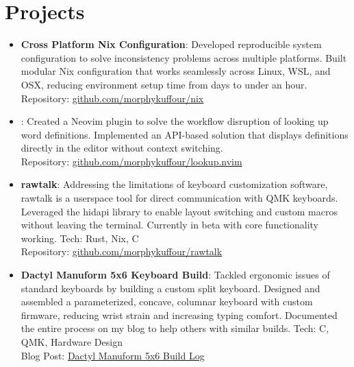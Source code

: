 \documentclass[a4paper,11pt]{article}
\newcommand{\resumeItem}[2]{
  \item\small{
    \textbf{#1}{: #2 \vspace{-2pt}}
  }
}
\newcommand{\resumeSubItem}[2]{\resumeItem{#1}{#2}\vspace{-3pt}}
\begin{document}
\section{Projects}
\vspace{5pt}
\begin{itemize}[leftmargin=0pt, label={}]  %
\resumeSubItem{\textbf{Cross Platform Nix Configuration}}{Developed reproducible system configuration to solve inconsistency problems across multiple platforms. Built modular Nix configuration that works seamlessly across Linux, WSL, and OSX, reducing environment setup time from days to under an hour. \\Repository: \href{https://github.com/morphykuffour/nix.git}{github.com/morphykuffour/nix}}
\vspace{2pt}

\resumeSubItem{}{Created a Neovim plugin to solve the workflow disruption of looking up word definitions. Implemented an API-based solution that displays definitions directly in the editor without context switching. \\Repository: \href{https://github.com/morphykuffour/lookup.nvim}{github.com/morphykuffour/lookup.nvim}}
\vspace{2pt}

\resumeSubItem{\textbf{rawtalk}}{Addressing the limitations of keyboard customization software, rawtalk is a userspace tool for direct communication with QMK keyboards. Leveraged the hidapi library to enable layout switching and custom macros without leaving the terminal. Currently in beta with core functionality working. Tech: Rust, Nix, C \\Repository: \href{https://github.com/morphykuffour/rawtalk.git}{github.com/morphykuffour/rawtalk}}
\vspace{2pt}

\resumeSubItem{\textbf{Dactyl Manuform 5x6 Keyboard Build}}{Tackled ergonomic issues of standard keyboards by building a custom split keyboard. Designed and assembled a parameterized, concave, columnar keyboard with custom firmware, reducing wrist strain and increasing typing comfort. Documented the entire process on my blog to help others with similar builds. Tech: C, QMK, Hardware Design \\Blog Post: \href{https://morphykuffour.github.io/keyboards,/ergonomics,/qmk/2021/12/29/Dactyl-Manuform.html}{Dactyl Manuform 5x6 Build Log}}
\vspace{2pt}



\end{itemize}
\end{document}
